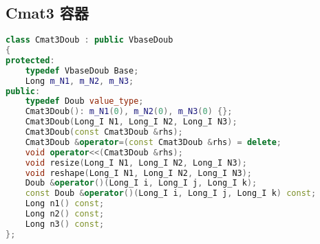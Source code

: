 \subsection{Cmat3 容器}
\begin{lstlisting}[language=cpp]
class Cmat3Doub : public VbaseDoub
{
protected:
    typedef VbaseDoub Base;
    Long m_N1, m_N2, m_N3;
public:
    typedef Doub value_type;
    Cmat3Doub(): m_N1(0), m_N2(0), m_N3(0) {};
    Cmat3Doub(Long_I N1, Long_I N2, Long_I N3);
    Cmat3Doub(const Cmat3Doub &rhs);
    Cmat3Doub &operator=(const Cmat3Doub &rhs) = delete;
    void operator<<(Cmat3Doub &rhs);
    void resize(Long_I N1, Long_I N2, Long_I N3);
    void reshape(Long_I N1, Long_I N2, Long_I N3);
    Doub &operator()(Long_I i, Long_I j, Long_I k);
    const Doub &operator()(Long_I i, Long_I j, Long_I k) const;
    Long n1() const;
    Long n2() const;
    Long n3() const;
};
\end{lstlisting}

